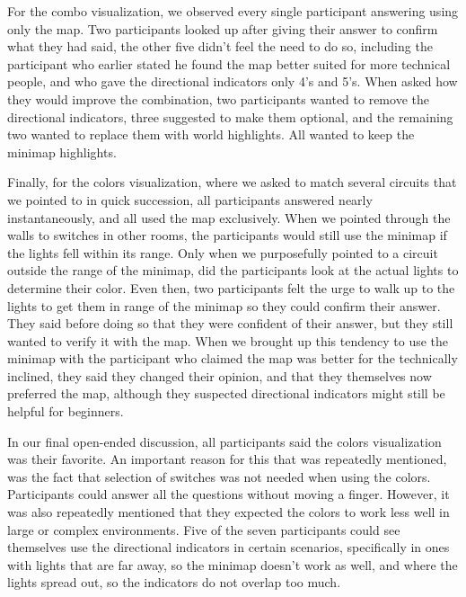 For the combo visualization, we observed every single participant answering using only the map. Two participants looked up after giving their answer to confirm what they had said, the other five didn't feel the need to do so, including the participant who earlier stated he found the map better suited for more technical people, and who gave the directional indicators only 4's and 5's. When asked how they would improve the combination, two participants wanted to remove the directional indicators, three suggested to make them optional, and the remaining two wanted to replace them with world highlights. All wanted to keep the minimap highlights.

Finally, for the colors visualization, where we asked to match several circuits that we pointed to in quick succession, all participants answered nearly instantaneously, and all used the map exclusively. When we pointed through the walls to switches in other rooms, the participants would still use the minimap if the lights fell within its range. Only when we purposefully pointed to a circuit outside the range of the minimap, did the participants look at the actual lights to determine their color. Even then, two participants felt the urge to walk up to the lights to get them in range of the minimap so they could confirm their answer. They said before doing so that they were confident of their answer, but they still wanted to verify it with the map. When we brought up this tendency to use the minimap with the participant who claimed the map was better for the technically inclined, they said they changed their opinion, and that they themselves now preferred the map, although they suspected directional indicators might still be helpful for beginners.

In our final open-ended discussion, all participants said the colors visualization was their favorite. An important reason for this that was repeatedly mentioned, was the fact that selection of switches was not needed when using the colors. Participants could answer all the questions without moving a finger. However, it was also repeatedly mentioned that they expected the colors to work less well in large or complex environments. Five of the seven participants could see themselves use the directional indicators in certain scenarios, specifically in ones with lights that are far away, so the minimap doesn't work as well, and where the lights spread out, so the indicators do not overlap too much.


